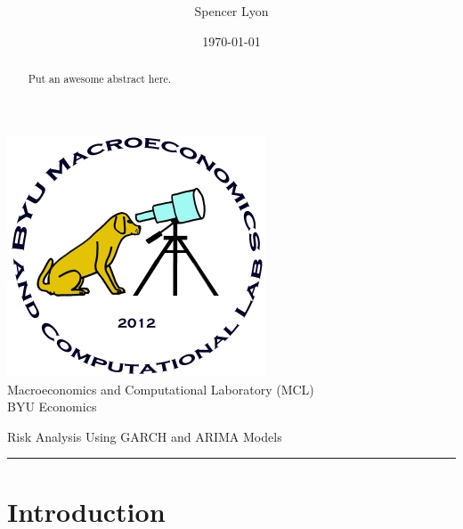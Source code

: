 \documentclass[a4paper, 11pt]{article}
\title{
    \vspace{-.6in}
    \usefont{OT1}{bch}{b}{n}
    \normalfont \normalsize \textsc{ } \\ [25pt]
    \horrule{0.5pt}
    \huge \thetitle \\
    \horrule{2pt}
  }
\author{
    Spencer Lyon
  }
\date{
  \normalfont \normalsize
  \today \\[-4pt] \normalsize
  }
\theoremstyle{definition} %
\numberwithin{equation}{section}
\newcommand \thetitle{Risk Analysis Using GARCH and ARIMA Models}
\begin{document}
\begin{titlepage}
  \maketitle
  \thispagestyle{empty}
  \begin{center}

  \includegraphics{Logo} \\ [0.8cm] %

  Macroeconomics and Computational Laboratory (MCL) \\[0.5cm] %
  BYU Economics\\[1.5cm]  %

  \begin{abstract}
      \normalsize
        Put an awesome abstract here.
  \end{abstract}
  \end{center}
  \tableofcontents
\end{titlepage}

\newpage
{}  %
\setcounter{page}{1}  %

\begin{center}
\huge{\thetitle}  %
\rule{\linewidth}{.1pt}
\end{center}


\section{Introduction} \label{sec:intro}
  \thispagestyle{empty}
  \pagestyle{mainDoc}
\end{document}
